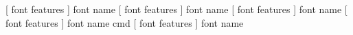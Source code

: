  [ font features ]  font name 
 [ font features ]  font name 
 [ font features ]  font name 
 [ font features ]  font name 
 cmd [ font features ]  font name 
